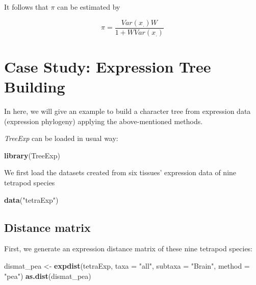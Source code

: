 \documentclass[]{book}
\newenvironment{Shaded}{\begin{snugshade}}{\end{snugshade}}
\newcommand{\DataTypeTok}[1]{\textcolor[rgb]{0.13,0.29,0.53}{#1}}
\newcommand{\KeywordTok}[1]{\textcolor[rgb]{0.13,0.29,0.53}{\textbf{#1}}}
\newcommand{\NormalTok}[1]{#1}
\newcommand{\StringTok}[1]{\textcolor[rgb]{0.31,0.60,0.02}{#1}}
\begin{document}
It follows that \(\pi\) can be estimated by

\[\pi=\frac{Var\left(x_{.}\right)W}{1+WVar(x_.)}\tag{1.11}\]
\newpage

\hypertarget{case-study-expression-tree-building}{%
\section{Case Study: Expression Tree Building}\label{case-study-expression-tree-building}}

In here, we will give an example to build a character tree from expression data (expression phylogeny) applying the above-mentioned methods.

\emph{TreeExp} can be loaded in usual way:

\begin{Shaded}
\begin{Highlighting}[]
\KeywordTok{library}\NormalTok{(TreeExp)}
\end{Highlighting}
\end{Shaded}

We first load the datasets created from six tissues' expression data of nine tetrapod species

\begin{Shaded}
\begin{Highlighting}[]
\KeywordTok{data}\NormalTok{(}\StringTok{"tetraExp"}\NormalTok{)}
\end{Highlighting}
\end{Shaded}

\hypertarget{distance-matrix}{%
\subsection{Distance matrix}\label{distance-matrix}}

First, we generate an expression distance matrix of these nine tetrapod species:

\begin{Shaded}
\begin{Highlighting}[]
\NormalTok{dismat_pea <-}\StringTok{ }\KeywordTok{expdist}\NormalTok{(tetraExp, }\DataTypeTok{taxa =} \StringTok{"all"}\NormalTok{,}
                 \DataTypeTok{subtaxa =} \StringTok{"Brain"}\NormalTok{,}
                 \DataTypeTok{method =} \StringTok{"pea"}\NormalTok{)}
\KeywordTok{as.dist}\NormalTok{(dismat_pea)}
\end{Highlighting}
\end{Shaded}
\end{document}
